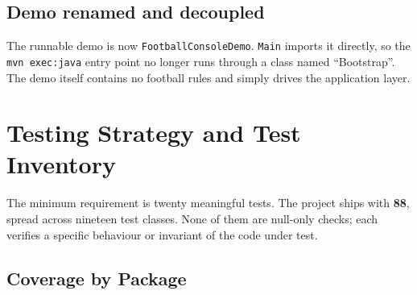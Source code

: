 \documentclass[11pt, a4paper]{article}
\newcommand{\code}[1]{\texttt{#1}}
\begin{document}
\subsection{Demo renamed and decoupled}

The runnable demo is now \code{FootballConsoleDemo}. \code{Main} imports
it directly, so the \code{mvn exec:java} entry point no longer runs through
a class named ``Bootstrap''. The demo itself contains no football rules
and simply drives the application layer.

\section{Testing Strategy and Test Inventory}

The minimum requirement is twenty meaningful tests. The project ships
with \textbf{88}, spread across nineteen test classes. None of them are
null-only checks; each verifies a specific behaviour or invariant of
the code under test.

\subsection{Coverage by Package}
\end{document}
